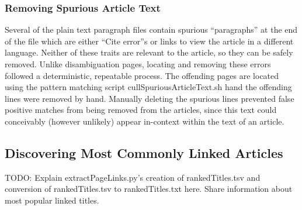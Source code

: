 \subsubsection{Removing Spurious Article Text}

Several of the plain text paragraph files contain spurious ``paragraphs'' at the end of the file which are either ``Cite error''s or links to view the article in a different language.
Neither of these traits are relevant to the article, so they can be safely removed.
Unlike disambiguation pages, locating and removing these errors followed a deterministic, repeatable process.
The offending pages are located using the pattern matching script cullSpuriousArticleText.sh hand the offending lines were removed by hand.
Manually deleting the spurious lines prevented false positive matches from being removed from the articles, since this text could conceivably (however unlikely) appear in-context within the text of an article.

\subsection{Discovering Most Commonly Linked Articles}

TODO: Explain extractPageLinks.py's creation of rankedTitles.tsv and conversion of rankedTitles.tsv to rankedTitles.txt here. Share information about most popular linked titles.
